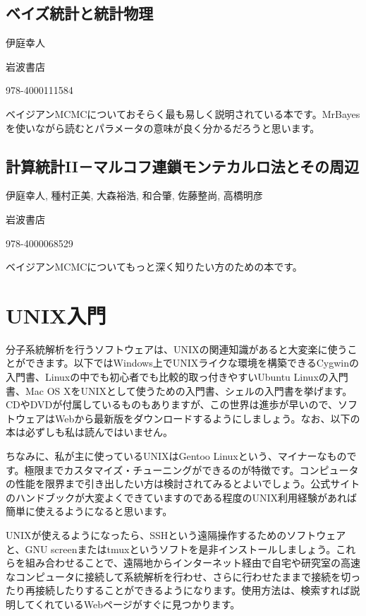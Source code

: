 \documentclass[titlepage,10pt,a4paper]{jsbook}
\begin{document}
\subsection*{ベイズ統計と統計物理}
\begin{description}\small\setlength{\baselineskip}{1.1em}
\item[著者] 伊庭幸人
\item[出版社] 岩波書店
\item[ISBN13] 978-4000111584
\end{description}
ベイジアンMCMCについておそらく最も易しく説明されている本です。MrBayesを使いながら読むとパラメータの意味が良く分かるだろうと思います。

\subsection*{計算統計II－マルコフ連鎖モンテカルロ法とその周辺}
\begin{description}\small\setlength{\baselineskip}{1.1em}
\item[著者] 伊庭幸人, 種村正美, 大森裕浩, 和合肇, 佐藤整尚, 高橋明彦
\item[出版社] 岩波書店
\item[ISBN13] 978-4000068529
\end{description}
ベイジアンMCMCについてもっと深く知りたい方のための本です。

\section{UNIX入門}

分子系統解析を行うソフトウェアは、UNIXの関連知識があると大変楽に使うことができます。以下ではWindows上でUNIXライクな環境を構築できるCygwinの入門書、Linuxの中でも初心者でも比較的取っ付きやすいUbuntu Linuxの入門書、Mac OS XをUNIXとして使うための入門書、シェルの入門書を挙げます。CDやDVDが付属しているものもありますが、この世界は進歩が早いので、ソフトウェアはWebから最新版をダウンロードするようにしましょう。なお、以下の本は必ずしも私は読んではいません。

ちなみに、私が主に使っているUNIXはGentoo Linuxという、マイナーなものです。極限までカスタマイズ・チューニングができるのが特徴です。コンピュータの性能を限界まで引き出したい方は検討されてみるとよいでしょう。公式サイトのハンドブックが大変よくできていますのである程度のUNIX利用経験があれば簡単に使えるようになると思います。

UNIXが使えるようになったら、SSHという遠隔操作するためのソフトウェアと、GNU screenまたはtmuxというソフトを是非インストールしましょう。これらを組み合わせることで、遠隔地からインターネット経由で自宅や研究室の高速なコンピュータに接続して系統解析を行わせ、さらに行わせたままで接続を切ったり再接続したりすることができるようになります。使用方法は、検索すれば説明してくれているWebページがすぐに見つかります。
\end{document}
